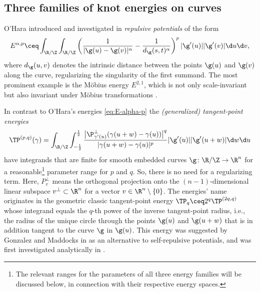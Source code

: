 \subsection{Three families of knot energies on curves}\label{sec:knot-energies}
O'Hara introduced and investigated
in \cite{ohara_1991a,ohara_1992a,ohara_1992b,ohara_1994}
\emph{repulsive potentials} of the form
\begin{equation}\label{eq:E-alpha-p}
E^{\alpha,p}\ceq\int_{\R/\Z}\int_{\R/\Z}\left(\frac1{|\g(u)-\g(v)|^\alpha}-\frac1{d_\g(s,t)^\alpha}\right)^p|\g'(u)||\g'(v)|\d u\d v,
\end{equation}
where $d_\g(u,v)$ denotes the intrinsic distance between the points $\g(u)$
and $\g(v)$ along the curve, regularizing the singularity of the first
summand. The most prominent example is the M\"obius energy
$E^{2,1}$, which  is not only scale-invariant but also invariant under
M\"obius transformations \cite[Theorem 2.1]{freedman-etal_1994}.

In contrast to O'Hara's energies \cref{eq:E-alpha-p} the \emph{(generalized)
tangent-point energies}
\begin{equation}\label{eq:TP}
 \TP^{(p,q)}(\gamma)= \int_{\R/\Z}\int_{-\frac{1}{2}}^\frac{1}{2}
\frac{\big|\P_{\gamma'(u)}^{\perp}(\gamma(u+w)-\gamma(u)) \big|^q}{|
\gamma(u+w)-\gamma(u)|^{p}}|\g'(u)||\g'(u+w)|\d w\d u
\end{equation}
have integrands that are finite for smooth embedded curves $\g \colon \R/\Z \to \R^n$
for a reasonable\footnote{The relevant ranges for the parameters of all
three energy families will be discussed below, in connection with
their respective energy spaces.}
parameter range for $p$ and $q$.
So, there is no need for a regularizing term. Here, $P_v^\perp$ means the
orthogonal projection onto the $(n-1)$-dimensional
linear subspace $v^\perp\subset\R^n$ for a vector $v\in\R^n\setminus\{0\}$.
The energies' name originates in the
geometric classic tangent-point energy $\TP_q\ceq2^q\TP^{(2q,q)}$ whose
integrand equals the $q$-th power of the inverse
tangent-point radius, i.e., the
radius of the unique circle through the points
$\g(u)$ and $\g(u+w)$ that is in addition tangent to the curve
$\g$ in $\g(u)$. 
This energy was suggested by Gonzalez and Maddocks in 
\cite[p. 4773]{gonzalez-maddocks_1999} as an alternative to self-repulsive
potentials, and was first investigated analytically in
\cite{strzelecki-vdm_2012}.

